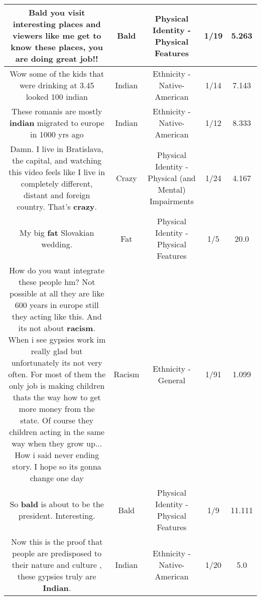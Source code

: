 \documentclass[11pt]{article}
\newlength\mylength
\begin{document}
\begin{center}
\begin{longtable}{|C{.65\mylength}|C{.30\mylength}|C{.12\mylength}|C{.12\mylength}|C{.12\mylength}|}
  \small Bald you visit interesting places and viewers like me get to know these places, you are doing great job!!\normalsize   & Bald & Physical Identity - Physical Features & 1/19 & 5.263 \\  \hline
  \small Wow some of the kids that were drinking at 3.45 looked 100  indian\normalsize   & Indian & Ethnicity - Native-American & 1/14 & 7.143 \\  \hline
  \small These romanis are mostly \textbf{indian} migrated to europe in 1000 yrs ago\normalsize   & Indian & Ethnicity - Native-American & 1/12 & 8.333 \\  \hline
  \small Damn. I live in Bratislava, the capital, and watching this video feels like I live in completely different, distant and foreign country. That's \textbf{crazy}.\normalsize   & Crazy & Physical Identity - Physical (and Mental) Impairments & 1/24 & 4.167 \\  \hline
  \small My big \textbf{fat} Slovakian wedding.\normalsize   & Fat & Physical Identity - Physical Features & 1/5 & 20.0 \\  \hline
  \small How do you want integrate these people hm? Not possible at all they are like 600 years in europe still they acting like this. And its not about \textbf{racism}. When i see gypsies work  im really glad but unfortunately its not very often. For most of them the only job is making children thats the way how to get more money from the state. Of course they children acting in the same way when they grow up... How i said never ending story. I hope so its gonna change one day\normalsize   & Racism & Ethnicity - General & 1/91 & 1.099 \\  \hline
  \small So \textbf{bald} is about to be the president. Interesting.\normalsize   & Bald & Physical Identity - Physical Features & 1/9 & 11.111 \\  \hline
  \small Now this is the proof that people are predisposed to their nature and culture , these gypsies truly are \textbf{Indian}.\normalsize   & Indian & Ethnicity - Native-American & 1/20 & 5.0 \\  \hline

\end{longtable}
\end{center}
\end{document}
